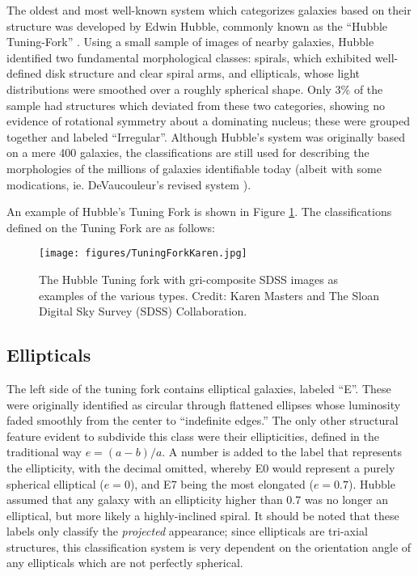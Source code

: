 The oldest and most well-known system which categorizes galaxies based on their structure was developed by Edwin Hubble, commonly known as the ``Hubble Tuning-Fork'' \citep{Hubble1926}. Using a small sample of images of nearby galaxies, Hubble identified two fundamental morphological classes: spirals, which exhibited well-defined disk structure and clear spiral arms, and ellipticals, whose light distributions were smoothed over a roughly spherical shape. Only 3\% of the sample had structures which deviated from these two categories, showing no evidence of rotational symmetry about a dominating nucleus; these were grouped together and labeled ``Irregular''. Although Hubble's system was originally based on a mere 400 galaxies, the classifications are still used for describing the morphologies of the millions of galaxies identifiable today (albeit with some modications, ie. DeVaucouleur's revised system \citep{DeVaucouleurs1963}).

An example of Hubble's Tuning Fork is shown in Figure \ref{fig:tuningfork}. The classifications defined on the Tuning Fork are as follows:

\begin{figure}
\centering
\texttt{[image: figures/TuningForkKaren.jpg]}
\label{fig:tuningfork}
\caption{The Hubble Tuning fork with gri-composite SDSS images as examples of the various types. Credit: Karen Masters and The Sloan Digital Sky Survey (SDSS) Collaboration.}
\end{figure}

\subsection{Ellipticals}

The left side of the tuning fork contains elliptical galaxies, labeled ``E''. These were originally identified as circular through flattened ellipses whose luminosity faded smoothly from the center to ``indefinite edges.'' The only other structural feature evident to subdivide this class were their ellipticities, defined in the traditional way $e=(a-b)/a$. A number is added to the label that represents the ellipticity, with the decimal omitted, whereby E0 would represent a purely spherical elliptical ($e=0$), and E7 being the most elongated ($e=0.7$). Hubble assumed that any galaxy with an ellipticity higher than 0.7 was no longer an elliptical, but more likely a highly-inclined spiral. It should be noted that these labels only classify the \emph{projected} appearance; since ellipticals are tri-axial structures, this classification system is very dependent on the orientation angle of any ellipticals which are not perfectly spherical.  

